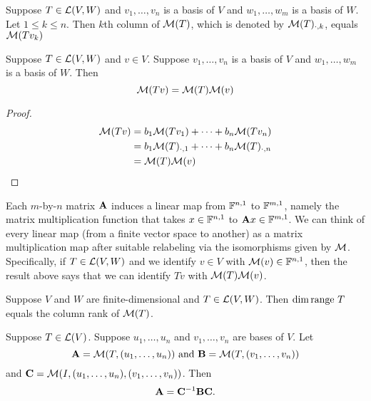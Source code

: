 \documentclass{extarticle}
\begin{document}
\begin{corollary}
    Suppose \(T \in \mathcal{L}(V, W)\) and \(v_1, \ldots, v_n\) is a basis of \(V\) and \(w_1, \ldots, w_m\)
    is a basis of \(W\). Let \(1 \leq k \leq n\). Then \(k\)th column of \(\mathcal{M}(T)\), which is denoted 
    by \(\mathcal{M}(T)_{\cdot, k}\), equals \(\mathcal{M}(T v_k)\)
\end{corollary}

\begin{thm}
    Suppose \(T \in \mathcal{L}(V, W)\) and \(v \in V\). Suppose \(v_1, \ldots, v_n\) is a basis of \(V\)
    and \(w_1, \ldots, w_m\) is a basis of \(W\). Then 
    \[\mathcal{M}(Tv) = \mathcal{M}(T) \mathcal{M}(v)\]
\end{thm}

\begin{proof}
\begin{align*}
    \mathcal{M}(Tv)
    &= b_1 \mathcal{M}(T v_1) + \cdots + b_n \mathcal{M}(T v_n) \\ 
    &= b_1 \mathcal{M}(T)_{\cdot, 1} + \cdots + b_n \mathcal{M}(T)_{\cdot, n} \\ 
    &= \mathcal{M}(T) \mathcal{M}(v)
\end{align*}
\end{proof}

\begin{remark}
    Each \(m\)-by-\(n\) matrix \(\mathbf{A}\) induces a linear map from \(\mathbb{F}^{n, 1}\) to \(\mathbb{F}^{m, 1}\), namely the matrix 
    multiplication function that takes \(x \in \mathbb{F}^{n, 1}\) to \(\mathbf{A} x \in \mathbb{F}^{m, 1}\). We can think of 
    every linear map (from a finite vector space to another) as a matrix multiplication map 
    after suitable relabeling via the isomorphisms given by \(\mathcal{M}\). Specifically, if \(T \in \mathcal{L}(V, W)\)
    and we identify \(v \in V\) with \(\mathcal{M}(v) \in \mathbb{F}^{n, 1}\), then the result above says that we 
    can identify \(Tv\) with \(\mathcal{M}(T) \mathcal{M}(v)\). 
\end{remark}

\begin{thm}
    Suppose \(V\) and \(W\) are finite-dimensional and \(T \in \mathcal{L}(V, W)\). Then \(\dim \text{range } T\)
    equals the column rank of \(\mathcal{M}(T)\). 
\end{thm}

\begin{thm}
    Suppose \(T \in \mathcal{L}(V)\). Suppose \(u_1, \ldots, u_n\) and \(v_1, \ldots, v_n\) are bases of 
    \(V\). Let 
    \[\mathbf{A} = \mathcal{M}(T, (u_1, \ldots, u_n)) \text{  and  } \mathbf{B} = \mathcal{M}(T, (v_1, \ldots, v_n))\]
    and \(\mathbf{C} = \mathcal{M}(I, (u_1, \ldots, u_n), (v_1, \ldots, v_n))\). Then 
    \[\mathbf{A} = \mathbf{C}^{-1} \mathbf{B} \mathbf{C}.\]
\end{thm}
\end{document}
